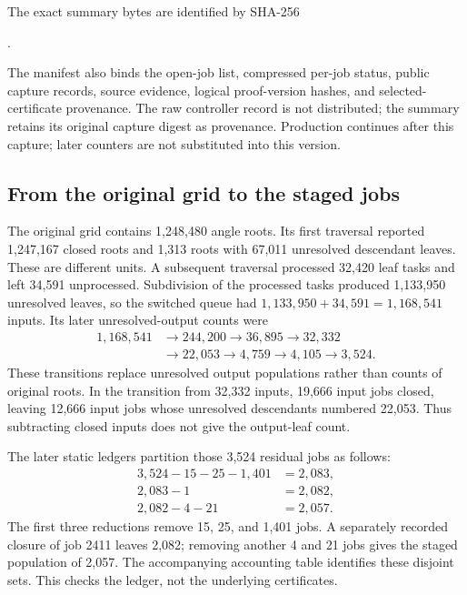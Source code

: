 The exact summary bytes are identified by SHA-256
\begin{center}\small
{}.
\end{center}
The manifest also binds the open-job list, compressed per-job status,
public capture records, source evidence, logical proof-version hashes,
and selected-certificate provenance. The raw controller record is not
distributed; the summary retains its original capture digest as
provenance. Production continues after this capture; later counters are
not substituted into this version.

\subsection{From the original grid to the staged jobs}
The original grid contains 1,248,480 angle roots. Its first traversal
reported 1,247,167 closed roots and 1,313 roots with 67,011 unresolved
descendant leaves. These are different units. A subsequent traversal
processed 32,420 leaf tasks and left 34,591 unprocessed. Subdivision of
the processed tasks produced 1,133,950 unresolved leaves, so the switched
queue had $1,133,950+34,591=1,168,541$ inputs. Its later unresolved-output
counts were
\[
\begin{split}
1,168,541&\longrightarrow244,200\longrightarrow36,895
\longrightarrow32,332\\
&\longrightarrow22,053\longrightarrow4,759
\longrightarrow4,105\longrightarrow3,524.
\end{split}
\]
These transitions replace unresolved output populations rather than
counts of original roots. In the transition from 32,332 inputs, 19,666
input jobs closed, leaving 12,666 input jobs whose unresolved descendants
numbered 22,053. Thus subtracting closed inputs does not give the
output-leaf count.

The later static ledgers partition those 3,524 residual jobs as follows:
\[
\begin{split}
3,524-15-25-1,401&=2,083,\\
2,083-1&=2,082,\\
2,082-4-21&=2,057.
\end{split}
\]
The first three reductions remove 15, 25, and 1,401 jobs. A separately
recorded closure of job 2411 leaves 2,082; removing another 4 and 21 jobs
gives the staged population of 2,057. The accompanying accounting table
identifies these disjoint sets. This checks the ledger, not the underlying
certificates.
